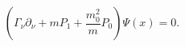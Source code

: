 \begin{equation}
\left( \Gamma _\nu \partial _\nu +mP_1+\frac{m_0^2}{m}P_0\right)
\Psi (x)=0 . \label{20}
\end{equation}

